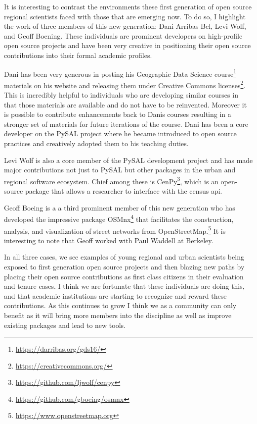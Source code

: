 \documentclass[11pt]{article}
\begin{document}
It is interesting to contrast the environments these first generation of open
source regional scientists faced with those that are emerging now. To do so, I
highlight the work of three members of this new generation: Dani Arribas-Bel,
Levi Wolf, and Geoff Boening. These individuals are prominent developers on
high-profile open source projects and have been very creative in positioning
their open source contributions into their formal academic profiles.

Dani has been very generous in posting his Geographic Data Science course\footnote{\url{https://darribas.org/gds16/}}
materials on his website and releasing them under Creative Commons
licenses\footnote{\url{https://creativecommons.org/}}.  This is incredibly helpful to individuals who are developing
similar courses in that those materials are available and do not have to be
reinvented. Moreover it is possible to contribute enhancements back to Danis
courses resulting in a stronger set of materials for future iterations of the
course. Dani has been a core developer on the PySAL project where he became
introduced to open source practices and creatively adopted them to his teaching
duties.


Levi Wolf is also a core member of the PySAL development project and has made
major contributions not just to PySAL but other packages in the urban and
regional software ecosystem. Chief among these is CenPy\footnote{\url{https://github.com/ljwolf/cenpy}}, which is an
open-source package that allows a researcher to interface with the census api.

Geoff Boeing is a a third prominent member of this new generation who has
developed the impressive package OSMnx\footnote{\url{https://github.com/gboeing/osmnx}} that facilitates the
construction, analysis, and visualization of street networks from
OpenStreetMap.\footnote{\url{https://www.openstreetmap.org}} It is interesting to note that Geoff worked with Paul
Waddell at Berkeley.

In all three cases, we see examples of young regional and urban scientists
being exposed to first generation open source projects and then blazing new
paths by placing their open source contributions as first class citizens in
their evaluation and tenure cases. I think we are fortunate that these
individuals are doing this, and that academic institutions are starting to
recognize and reward these contributions. As this continues to grow I think we
as a community can only benefit as it will bring more members into the
discipline as well as improve existing packages and lead to new tools.
\end{document}
